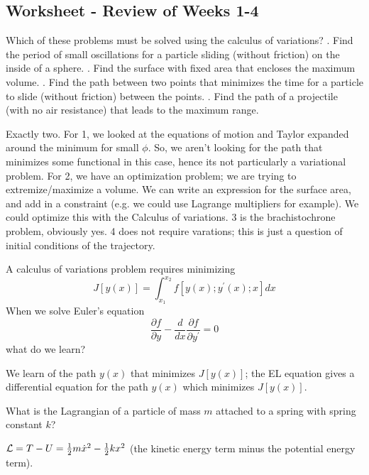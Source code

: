 \documentclass[../PHYS306Notes.tex]{subfiles}
\begin{document}
\subsection{Worksheet - Review of Weeks 1-4}
\begin{p}
Which of these problems must be solved using the calculus of variations?
. Find the period of small oscillations for a particle sliding (without friction) on the inside of a sphere.
. Find the surface with fixed area that encloses the maximum volume.
. Find the path between two points that minimizes the time for a particle to slide (without friction) between the points.
. Find the path of a projectile (with no air resistance) that leads to the maximum range.
\end{p}
\begin{s}
Exactly two. For 1, we looked at the equations of motion and Taylor expanded around the minimum for small $\phi$. So, we aren't looking for the path that minimizes some functional in this case, hence its not particularly a variational problem. For 2, we have an optimization problem; we are trying to extremize/maximize a volume. We can write an expression for the surface area, and add in a constraint (e.g. we could use Lagrange multipliers for example). We could optimize this with the Calculus of variations. 3 is the brachistochrone problem, obviously yes. 4 does not require varations; this is just a question of initial conditions of the trajectory.
\end{s}

\begin{p}
A calculus of variations problem requires minimizing
$$
J[y(x)]=\int_{x_{1}}^{x_{2}} f\left[y(x) ; y^{\prime}(x) ; x\right] d x
$$
When we solve Euler's equation
$$
\frac{\partial f}{\partial y}-\frac{d}{d x} \frac{\partial f}{\partial y^{\prime}}=0
$$
what do we learn?
\end{p}
\begin{s}
We learn of the path $y(x)$ that minimizes $J[y(x)]$; the EL equation gives a differential equation for the path $y(x)$ which minimizes $J[y(x)]$.
\end{s}

\begin{p}
What is the Lagrangian of a particle of mass $m$ attached to a spring with spring constant $k$?
\end{p}
\begin{s}
$\mathcal{L} = T - U = \frac{1}{2}m\dot{x}^2 - \frac{1}{2}kx^2$ (the kinetic energy term minus the potential energy term).
\end{s}
\end{document}

